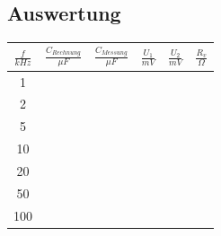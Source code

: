 \documentclass{article}
\begin{document}
\subsection{Auswertung}
\begin{center}

  \begin{tabular}{|c|c|c|c|c|c|}
    \hline
    $\frac{f}{kHz}$ & $\frac{C_{Rechnung}}{\mu F}$ & $\frac{C_{Messung}}{\mu F}$ & $\frac{U_1}{mV}$ & $\frac{U_2}{mV}$ & $\frac{R_v}{\Omega}$ \\
    \hline
    1               &                              &                             &                  &                  &                      \\
    \hline
    2               &                              &                             &                  &                  &                      \\
    \hline
    5               &                              &                             &                  &                  &                      \\
    \hline
    10              &                              &                             &                  &                  &                      \\
    \hline
    20              &                              &                             &                  &                  &                      \\
    \hline
    50              &                              &                             &                  &                  &                      \\
    \hline
    100             &                              &                             &                  &                  &                      \\
    \hline
  \end{tabular}
\end{center}

\newpage
\begin{figure}

\end{figure}
\end{document}
